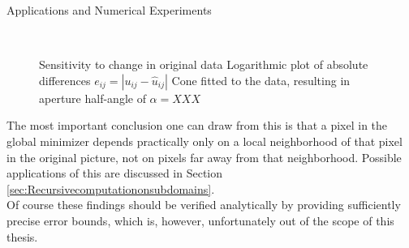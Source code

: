 \begin{chapter}{Applications and Numerical Experiments}
\begin{figure}[h!]
    \centering
    \\
    \caption[Sensitivity to variation]{Sensitivity to change in original data
	 Logarithmic plot of absolute differences $e_{ij}=|u_{ij}-\hat{u}_{ij}|$
	 Cone fitted to the data, resulting in aperture half-angle of $\alpha=XXX$
	\label{fig:experiment_sensitivity}
    }
\end{figure}

The most important conclusion one can draw from this is that a pixel in the global minimizer depends practically only on a local neighborhood of that pixel
in the original picture, not on pixels far away from that neighborhood. Possible applications of this are discussed in Section \ref{sec:Recursivecomputationonsubdomains}.\\

Of course these findings should be verified analytically by providing sufficiently precise error bounds, which is, however, unfortunately out of the scope of this thesis.


\end{chapter}
